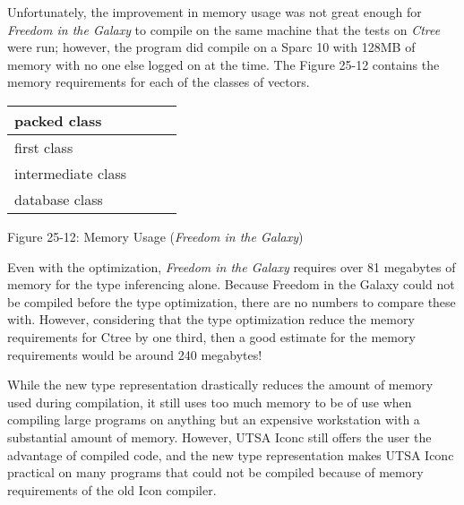 Unfortunately, the improvement in memory usage was not great enough
for \textit{Freedom in the Galaxy} to compile on the same machine that
the tests on \textit{Ctree} were run; however, the program did compile
on a Sparc 10 with 128MB of memory with no one else logged on at the
time. The Figure 25-12 contains the memory requirements for each of
the classes of vectors.

\begin{center}
\tabletail{}
\tablelasttail{}
\begin{supertabular}{|m{1.2288599in}|m{1.2170599in}|m{1.2427598in}|m{1.6538599in}|}
\hline
 packed class &
 &
 &
\raggedleft{}\\\hline
 first class &
 &
 &
\raggedleft{}\\\hline
 intermediate class &
 &
 &
\raggedleft{}\\\hline
 database class &
 &
 &
\raggedleft{}\\\hline
\end{supertabular}
\end{center}
{\centering{}
Figure 25-12: Memory Usage (\textit{Freedom in the Galaxy})
\par}


Even with the optimization, \textit{Freedom in the Galaxy} requires
over 81 megabytes of memory for the type inferencing alone. Because
Freedom in the Galaxy could not be compiled before the type
optimization, there are no numbers to compare these with. However,
considering that the type optimization reduce the memory requirements
for Ctree by one third, then a good estimate for the memory
requirements would be around 240 megabytes!

While the new type representation drastically reduces the amount of
memory used during compilation, it still uses too much memory to be of
use when compiling large programs on anything but an expensive
workstation with a substantial amount of memory. However, UTSA Iconc
still offers the user the advantage of compiled code, and the new type
representation makes UTSA Iconc practical on many programs that could
not be compiled because of memory requirements of the old Icon
compiler.

